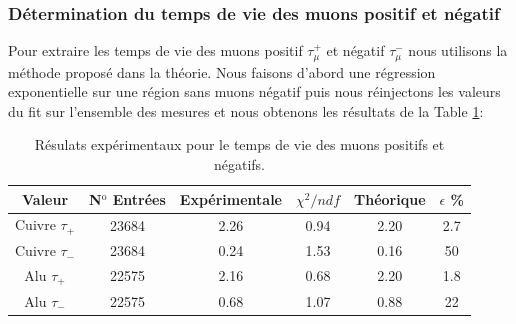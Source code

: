 \documentclass[12pt]{article}
\begin{document}
\subsubsection{Détermination du temps de vie des muons positif et négatif}

Pour extraire les temps de vie des muons positif $\tau^{+}_{\mu}$ et négatif $\tau^{-}_{\mu}$ nous utilisons la méthode proposé dans la théorie. Nous faisons d'abord une régression exponentielle sur une région sans muons négatif puis nous réinjectons les valeurs du fit sur l'ensemble des mesures et nous obtenons les résultats de la Table \ref{TauPositifNegatif}:


\begin{table}[htbp!]
  \centering
  \captionsetup{width=0.9\textwidth}
  \caption{Résulats expérimentaux pour le temps de vie des muons positifs et négatifs.}
  \begin{tabular}{cccccc}
     Valeur & N$^{\text{o}}$ Entrées & Expérimentale & $\chi^{2}/ndf$  & Théorique & $\epsilon$ \%\\
    \hline
    Cuivre $\tau_{+}$ & 23684 & 2.26 & 0.94 & 2.20 & 2.7\\
    Cuivre $\tau_{-}$ & 23684 & 0.24 & 1.53 & 0.16 & 50 \\
    Alu $\tau_{+}$ & 22575 & 2.16 & 0.68 & 2.20 & 1.8\\
    Alu $\tau_{-}$ & 22575 & 0.68 & 1.07 & 0.88 & 22\\
\end{tabular}
\label{TauPositifNegatif}
\end{table}
\end{document}
